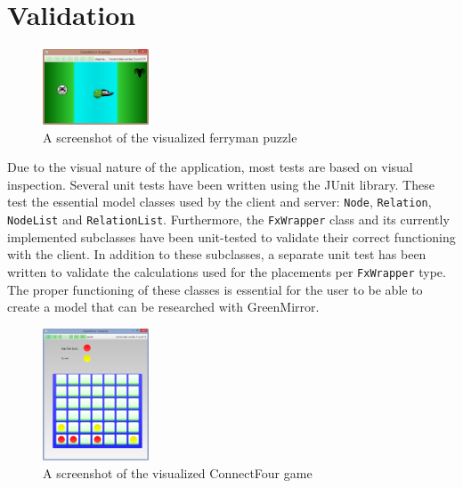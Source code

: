 \documentclass[a4paper]{article}
\begin{document}
\newpage
\section{Validation}\label{sec:validation}
\begin{figure}\vspace{-22pt}
  \begin{center}
    \includegraphics[width=0.28\textwidth]{images/ferryman}
  \end{center}
  \vspace{-10pt}\caption{A screenshot of the visualized ferryman puzzle}\vspace{-10pt}
  \label{fig:ferryman}
\end{figure}
Due to the visual nature of the application, most tests are based on visual inspection. Several unit tests have been written using the JUnit library. These test the essential model classes used by the client and server: \lstinline{Node}, \lstinline{Relation}, \lstinline{NodeList} and \lstinline{RelationList}. Furthermore, the \lstinline{FxWrapper} class and its currently implemented subclasses have been unit-tested to validate their correct functioning with the client. In addition to these subclasses, a separate unit test has been written to validate the calculations used for the placements per \lstinline{FxWrapper} type. The proper functioning of these classes is essential for the user to be able to create a model that can be researched with GreenMirror.

\begin{figure}\vspace{-22pt}
  \begin{center}
    \includegraphics[width=0.28\textwidth]{images/connectfour}
  \end{center}
  \vspace{-10pt}\caption{A screenshot of the visualized ConnectFour game}\vspace{-10pt}
  \label{fig:connectfour}
\end{figure}
\end{document}
